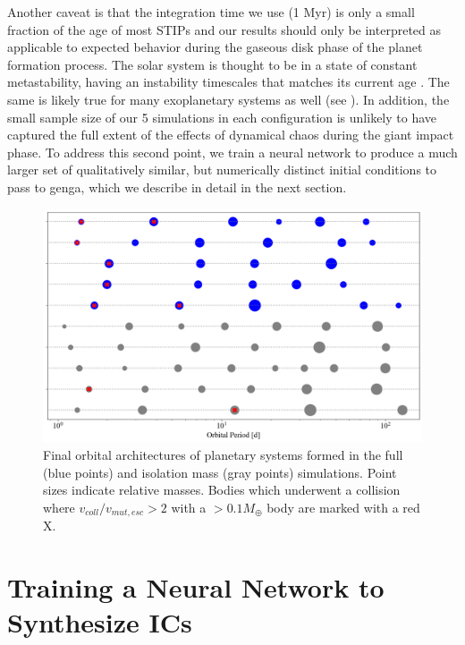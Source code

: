 Another caveat is that the integration time we use (1 Myr) is only a small fraction of the age of most STIPs \cite{silvaaguirre15} and our results should only be interpreted as applicable to expected behavior during the gaseous disk phase of the planet formation process. The solar system is thought to be in a state of constant metastability, having an instability timescales that matches its current age \cite{laskar96}. The same is likely true for many exoplanetary systems as well (see \cite{deck12, lissauer12, lissauer13}). In addition, the small sample size of our 5 simulations in each configuration is unlikely to have captured the full extent of the effects of dynamical chaos during the giant impact phase. To address this second point, we train a neural network to produce a much larger set of qualitatively similar, but numerically distinct initial conditions to pass to {\sc genga}, which we describe in detail in the next section.

\begin{figure}
\begin{center}
    \includegraphics[width=\textwidth]{figures/stip/architectures_iso_comp.png}
    \caption{Final orbital architectures of planetary systems formed in the full (blue points) and isolation mass (gray points) simulations. Point sizes indicate relative masses. Bodies which underwent a collision where $v_{coll}/v_{mut,esc} > 2$ with a $> 0.1 M_{\oplus}$ body are marked with a red X.\label{fig:architectures_iso_comp}}
\end{center}
\end{figure}

\section{Training a Neural Network to Synthesize ICs} \label{sec:neuralICs}

